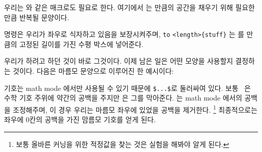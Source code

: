 우리는  와 같은 매크로도 필요로 한다.
여기에서 는  만큼의 공간을 채우기 위해 필요한 만큼
반복될 문양이다.
\begin{lcode}
\newcommand{\chain}[2]{\leavevmode\hbox to #2{\motif{#1}}}
\end{lcode}
\cmd{\leavevmode} 명령은 우리가 좌우로 식자하고 있음을 보장시켜주며,
\cmd{\hbox} \verb?to? \verb?<length>{stuff}? 는  를
 만큼의 고정된 길이를 가진 수평 박스에 넣어준다.

우리가 하려고 하던 것이 바로 그것이다.
이제 남은 일은 어떤 모양을 사용할지 결정하는 것이다.
다음은 마름모 문양으로 이루어진 한 예시이다:

\begin{lcode}
\makeatletter
\newcommand{\diamonds}{\m@th$\mkern-.6mu \diamond \mkern-.6mu$}
\makeatother
\end{lcode}

\cmd{\diamond} 기호는 math mode 에서만 사용될 수 있기 때문에
\verb?$...$?로 둘러싸여 있다. 
보통 \tx\ 은 수학 기호 주위에 약간의 공백을 주지만 \cmd{\m@th}은 그를 막아준다.
\cmd{\mkern}는 math mode 에서의 공백을 조정해주며,
이 경우 우리는 마름모 좌우에 있었을 공백을 제거한다.
\footnote{보통 올바른 커닝\label{fn:kerning}을 위한 적정값을 찾는 것은 실험을 해봐야 알게 된다.}
최종적으로는 좌우에 0칸의 공백을 가진 맘름모 기호를 얻게 된다.

